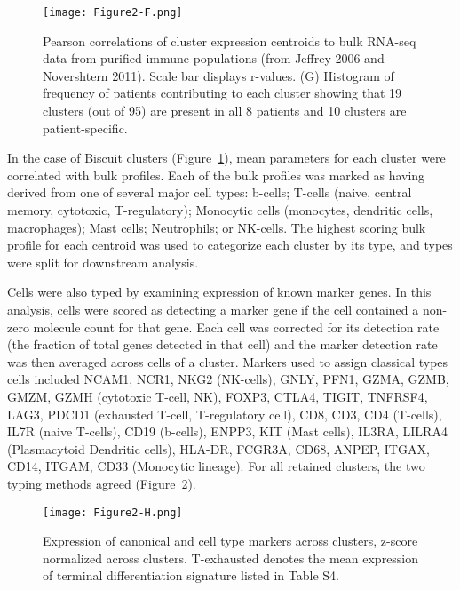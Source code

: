 \begin{figure}
\centering
\texttt{[image: Figure2-F.png]}
\caption{Pearson correlations of cluster expression centroids to bulk RNA-seq data from purified immune populations (from Jeffrey 2006 and Novershtern 2011). Scale bar displays r-values.
(G) Histogram of frequency of patients contributing to each cluster showing that 19 clusters (out of 95) are present in all 8 patients and 10 clusters are patient-specific.
}
\label{fig:2f}
\end{figure}

In the case of Biscuit clusters (Figure~\ref{fig:2f}), mean parameters for each cluster were correlated with bulk profiles.
Each of the bulk profiles was marked as having derived from one of several major cell types: b-cells; T-cells (naive, central memory, cytotoxic, T-regulatory); Monocytic cells (monocytes, dendritic cells, macrophages); Mast cells; Neutrophils; or NK-cells.
The highest scoring bulk profile for each centroid was used to categorize each cluster by its type, and types were split for downstream analysis.

Cells were also typed by examining expression of known marker genes.
In this analysis, cells were scored as detecting a marker gene if the cell contained a non-zero molecule count for that gene.
Each cell was corrected for its detection rate (the fraction of total genes detected in that cell) and the marker detection rate was then averaged across cells of a cluster.
Markers used to assign classical types cells included NCAM1, NCR1, NKG2 (NK-cells), GNLY, PFN1, GZMA, GZMB, GMZM, GZMH (cytotoxic T-cell, NK), FOXP3, CTLA4, TIGIT, TNFRSF4, LAG3, PDCD1 (exhausted T-cell, T-regulatory cell), CD8, CD3, CD4 (T-cells), IL7R (naive T-cells), CD19 (b-cells), ENPP3, KIT (Mast cells), IL3RA, LILRA4 (Plasmacytoid Dendritic cells), HLA-DR, FCGR3A, CD68, ANPEP, ITGAX, CD14, ITGAM, CD33 (Monocytic lineage).
For all retained clusters, the two typing methods agreed (Figure~\ref{fig:2h}).

\begin{figure}
\centering
\texttt{[image: Figure2-H.png]}
\caption{Expression of canonical and cell type markers across clusters, z-score normalized across clusters. T-exhausted denotes the mean expression of terminal differentiation signature listed in Table S4.
} %
\label{fig:2h}
\end{figure}

